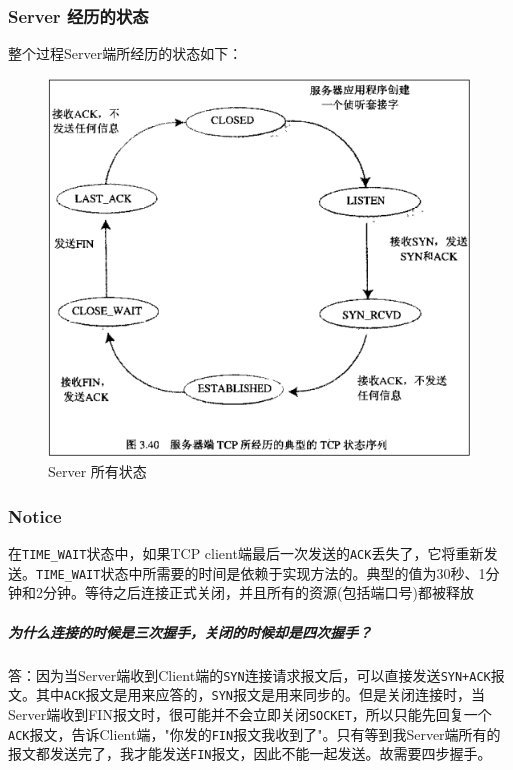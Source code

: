 \documentclass[UTF8,a4paper,8pt]{ctexbook}
\begin{document}
			\subsubsection{Server 经历的状态}
			整个过程Server端所经历的状态如下：
			\begin{figure}[ht]
				\centering
				\includegraphics[scale = 0.7]{Server-status.png}
				\caption{Server 所有状态}
				\label{serverStatus}
			\end{figure}	
			
			\subsubsection{Notice}
				在\verb|TIME_WAIT|状态中，如果TCP client端最后一次发送的\verb|ACK|丢失了，它将重新发送。\verb|TIME_WAIT|状态中所需要的时间是依赖于实现方法的。典型的值为30秒、1分钟和2分钟。等待之后连接正式关闭，并且所有的资源(包括端口号)都被释放
				
				\subparagraph{为什么连接的时候是三次握手，关闭的时候却是四次握手？}
					答：因为当Server端收到Client端的\verb|SYN|连接请求报文后，可以直接发送\verb|SYN+ACK|报文。其中\verb|ACK|报文是用来应答的，\verb|SYN|报文是用来同步的。但是关闭连接时，当Server端收到FIN报文时，很可能并不会立即关闭\verb|SOCKET|，所以只能先回复一个\verb|ACK|报文，告诉Client端，"你发的\verb|FIN|报文我收到了"。只有等到我Server端所有的报文都发送完了，我才能发送\verb|FIN|报文，因此不能一起发送。故需要四步握手。
					
\end{document}
